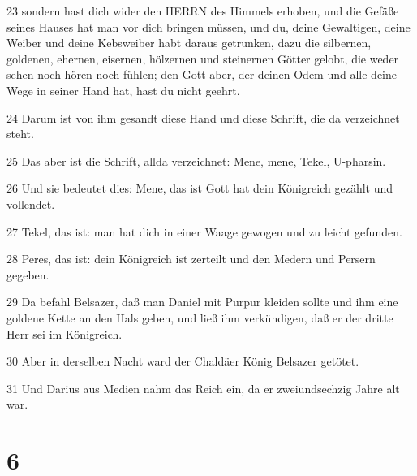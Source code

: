 \par 23 sondern hast dich wider den HERRN des Himmels erhoben, und die Gefäße seines Hauses hat man vor dich bringen müssen, und du, deine Gewaltigen, deine Weiber und deine Kebsweiber habt daraus getrunken, dazu die silbernen, goldenen, ehernen, eisernen, hölzernen und steinernen Götter gelobt, die weder sehen noch hören noch fühlen; den Gott aber, der deinen Odem und alle deine Wege in seiner Hand hat, hast du nicht geehrt.
\par 24 Darum ist von ihm gesandt diese Hand und diese Schrift, die da verzeichnet steht.
\par 25 Das aber ist die Schrift, allda verzeichnet: Mene, mene, Tekel, U-pharsin.
\par 26 Und sie bedeutet dies: Mene, das ist Gott hat dein Königreich gezählt und vollendet.
\par 27 Tekel, das ist: man hat dich in einer Waage gewogen und zu leicht gefunden.
\par 28 Peres, das ist: dein Königreich ist zerteilt und den Medern und Persern gegeben.
\par 29 Da befahl Belsazer, daß man Daniel mit Purpur kleiden sollte und ihm eine goldene Kette an den Hals geben, und ließ ihm verkündigen, daß er der dritte Herr sei im Königreich.
\par 30 Aber in derselben Nacht ward der Chaldäer König Belsazer getötet.
\par 31 Und Darius aus Medien nahm das Reich ein, da er zweiundsechzig Jahre alt war.

\chapter{6}

